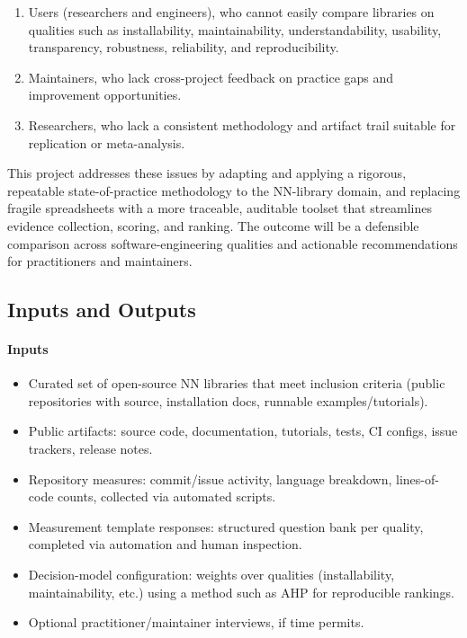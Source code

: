 \documentclass{article}
\begin{document}
\begin{enumerate}
  \item Users (researchers and engineers), who cannot easily compare libraries 
  on qualities such as installability, maintainability, understandability, usability, 
  transparency, robustness, reliability, and reproducibility.
  
  \item Maintainers, who lack cross-project feedback on practice gaps and 
  improvement opportunities.
  
  \item Researchers, who lack a consistent methodology and artifact trail 
  suitable for replication or meta-analysis.
\end{enumerate}

This project addresses these issues by adapting and applying a rigorous,
repeatable state-of-practice methodology to the NN-library domain, and
replacing fragile spreadsheets with a more traceable, auditable toolset that
streamlines evidence collection, scoring, and ranking. The outcome will be a
defensible comparison across software-engineering qualities and actionable
recommendations for practitioners and maintainers.


\subsection{Inputs and Outputs}
\paragraph{Inputs}
\begin{itemize}
  \item Curated set of open-source NN libraries that meet inclusion criteria
  (public repositories with source, installation docs, runnable examples/tutorials).
  \item Public artifacts: source code, documentation, tutorials, tests, CI configs,
  issue trackers, release notes.
  \item Repository measures: commit/issue activity, language breakdown,
  lines-of-code counts, collected via automated scripts.
  \item Measurement template responses: structured question bank per quality,
  completed via automation and human inspection.
  \item Decision-model configuration: weights over qualities (installability,
  maintainability, etc.) using a method such as AHP for reproducible rankings.
  \item Optional practitioner/maintainer interviews, if time permits.
\end{itemize}
\end{document}
